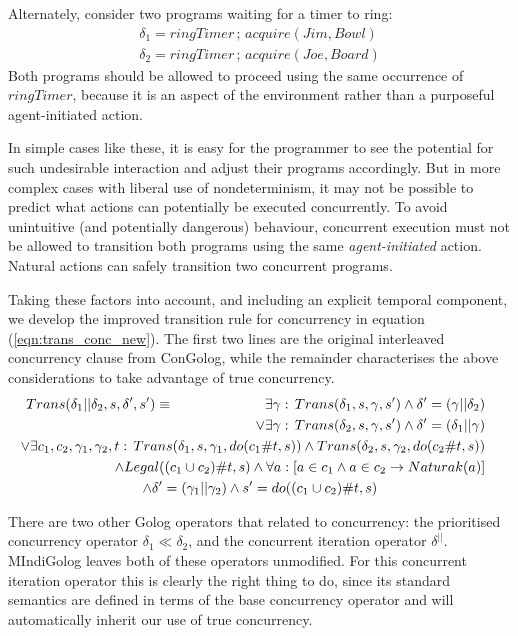 Alternately, consider two programs waiting for a timer to ring:\begin{gather*}
\delta_{1}=ringTimer\,;\, acquire(Jim,Bowl)\\
\delta_{2}=ringTimer\,;\, acquire(Joe,Board)\end{gather*}
 Both programs should be allowed to proceed using the same occurrence
of $ringTimer$, because it is an aspect of the environment rather
than a purposeful agent-initiated action.

In simple cases like these, it is easy for the programmer to see the
potential for such undesirable interaction and adjust their programs
accordingly. But in more complex cases with liberal use of nondeterminism,
it may not be possible to predict what actions can potentially be
executed concurrently. To avoid unintuitive (and potentially dangerous)
behaviour, concurrent execution must not be allowed to transition
both programs using the same \emph{agent-initiated} action. Natural
actions can safely transition two concurrent programs.

Taking these factors into account, and including an explicit temporal
component, we develop the improved transition rule for concurrency
in equation (\ref{eqn:trans_conc_new}). The first two lines are the
original interleaved concurrency clause from ConGolog, while the remainder
characterises the above considerations to take advantage of true concurrency.\begin{multline}
Trans(\delta_{1}||\delta_{2},s,\delta',s')\equiv\,\,\,\,\,\,\,\,\,\,\,\,\,\,\,\,\,\,\,\,\,\,\,\,\,\,\,\,\,\,\,\,\,\,\,\,\,\,\,\shoveright{\exists\gamma:\, Trans(\delta_{1},s,\gamma,s')\wedge\delta'=(\gamma||\delta_{2})}\\
\shoveright{\vee\exists\gamma:\, Trans(\delta_{2},s,\gamma,s')\wedge\delta'=(\delta_{1}||\gamma)}\\
\shoveright{\vee\exists c_{1},c_{2},\gamma_{1},\gamma_{2},t:\, Trans(\delta_{1},s,\gamma_{1},do(c_{1}\#t,s))\wedge Trans(\delta_{2},s,\gamma_{2},do(c_{2}\#t,s))}\\
\shoveright{\wedge Legal((c_{1}\cup c_{2})\#t,s)\wedge\forall a:\left[a\in c_{1}\wedge a\in c_{2}\rightarrow Naturak(a)\right]}\\
\wedge\delta'=(\gamma_{1}||\gamma_{2})\wedge s'=do((c_{1}\cup c_{2})\#t,s)\label{eqn:trans_conc_new}\end{multline}


There are two other Golog operators that related to concurrency: the
prioritised concurrency operator $\delta_{1}\ll\delta_{2}$, and the
concurrent iteration operator $\delta^{||}$. MIndiGolog leaves both
of these operators unmodified. For this concurrent iteration operator
this is clearly the right thing to do, since its standard semantics
are defined in terms of the base concurrency operator and will automatically
inherit our use of true concurrency.

